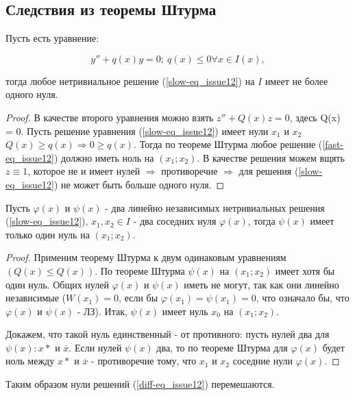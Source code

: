 \subsection{Следствия из теоремы Штурма}

\begin{corollary}\label{zero-quant_in-diff_issue12}
Пусть есть уравнение:

\[y'' + q(x)y = 0; \: q(x) \leq0 \forall x \in I(x),\]

тогда любое нетривиальное решение (\ref{slow-eq_issue12}) на $I$ имеет не более одного нуля.
\end{corollary}

\begin{proof}
В качестве второго уравнения можно взять $z'' + Q(x)z = 0$, здесь Q(x) = 0. Пусть решение уравнения (\ref{slow-eq_issue12}) имеет нули $x_1$ и $x_2$ $Q(x) \geq q(x) \Rightarrow 0 \geq q(x)$. Тогда по теореме Штурма любое решение (\ref{fast-eq_issue12}) должно иметь ноль на $(x_1;x_2)$. В качестве решения можем вщять $z\equiv 1$, которое не и имеет нулей $\Rightarrow$ противоречие $\Rightarrow$ для решения (\ref{slow-eq_issue12}) не может быть больше одного нуля.
\end{proof}

\begin{corollary}\label{line-indep-sol-zeros_issue12}
Пусть $\varphi (x)$ и $\psi (x)$ - два линейно независимых нетривиальных решения (\ref{slow-eq_issue12}), $x_1, x_2 \in I$ - два соседних нуля $\varphi (x)$, тогда $\psi (x)$ имеет только один нуль на $(x_1;x_2)$.
\end{corollary}

\begin{proof}
Применим теорему Штурма к двум одинаковым уравнениям $(Q(x) \leq Q(x))$. По теореме Штурма $\psi (x)$ на $(x_1;x_2)$ имеет хотя бы один нуль. Общих нулей $\varphi (x)$ и $\psi (x)$ иметь не могут, так как они линейно независимые ($W(x_1) = 0$, если бы $\varphi (x_1) = \psi (x_1) = 0$, что означало бы, что $\varphi(x)$ и $\psi(x)$ - ЛЗ). Итак, $\psi (x)$ имеет нуль $x_0$ на $(x_1;x_2)$.

Докажем, что такой нуль единственный - от противного: пусть нулей два для $\psi (x): x*$ и $\overline{x}$. Если нулей $\psi (x)$ два, то по теореме Штурма для $\varphi (x)$ будет ноль между $x*$ и $\overline{x}$ - противоречие тому, что $x_1$ и $x_2$ соседние нули $\varphi (x)$.
\end{proof}

Таким образом нули решений (\ref{diff-eq_issue12}) перемешаются.

